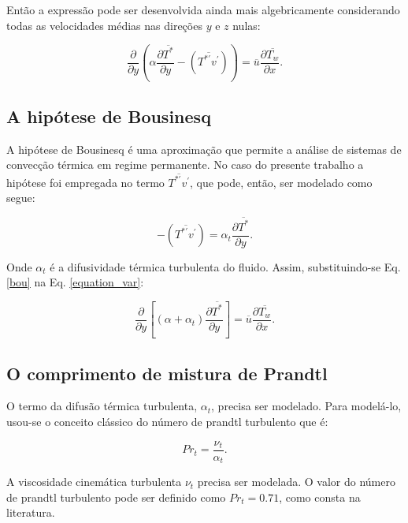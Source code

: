 Então a expressão pode ser desenvolvida ainda mais algebricamente considerando todas as velocidades médias nas direções $y$ e $z$ nulas:

\begin{equation}\label{equation_var}
{\frac{\partial{}}{\partial{y}}} \left(\alpha {\frac{\partial{\overline{T^\ast}}}{\partial{y}}}   
- \left(\overline{ T^{\ast\prime} v^\prime}\right) \right)
= 
\overline{u}\frac{\partial{\overline{T_w}}}{\partial{x}}.
\end{equation}

\subsection{A hipótese de Bousinesq}

A hipótese de Bousinesq é uma aproximação que permite a análise de sistemas de convecção térmica em regime permanente. No caso do presente trabalho a hipótese foi empregada no termo $\overline{T^{\ast\prime}  v^\prime}$, que pode, então, ser modelado como segue:

\begin{equation}\label{bou}
-\left(\overline{ T^{\ast\prime}  v^\prime}\right) = 
\alpha_t \frac{\partial{\overline{T^\ast}}}{\partial{y}}.
\end{equation}

Onde $\alpha_t$ é a difusividade térmica turbulenta do fluido. Assim, substituindo-se Eq. \ref{bou} na Eq. \ref{equation_var}:

\begin{equation}\label{oiiiii}
{\frac{\partial{}}{\partial{y}}} \left[(\alpha + \alpha_t)  \frac{\partial \overline{T^\ast}}{\partial y} \right]
= 
\overline{u}\frac{\partial{\overline{T_w}}}{\partial{x}}. 
\end{equation}

\subsection{O comprimento de mistura de Prandtl}

O termo da difusão térmica turbulenta, $\alpha_t$, precisa ser modelado. Para modelá-lo, usou-se o conceito clássico do número de prandtl turbulento que é:

\begin{equation}
Pr_t = \frac{\nu_t}{\alpha_t}.
\end{equation} 

A viscosidade cinemática turbulenta $\nu_t$ precisa ser modelada. O valor do número de prandtl turbulento pode ser definido como $Pr_t = 0.71$, como consta na literatura.

